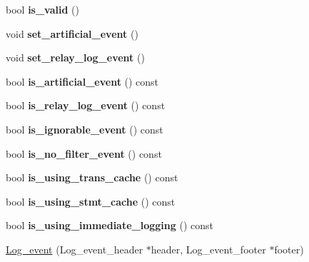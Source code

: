 \begin{DoxyCompactItemize}
\item 
\mbox{\label{classLog__event_a36936e4c8aef6409e355e88ac04c527d}} 
bool {\bfseries is\+\_\+valid} ()
\item 
\mbox{\label{classLog__event_a727215ddea7b935092b3f97e3308b9cf}} 
void {\bfseries set\+\_\+artificial\+\_\+event} ()
\item 
\mbox{\label{classLog__event_ad9626915a89bcd450bc21f5d02077a4d}} 
void {\bfseries set\+\_\+relay\+\_\+log\+\_\+event} ()
\item 
\mbox{\label{classLog__event_aeca51c1f34e0519609d29190d897b4e3}} 
bool {\bfseries is\+\_\+artificial\+\_\+event} () const
\item 
\mbox{\label{classLog__event_a58c2463530e94d5e16f3e4245886ec7a}} 
bool {\bfseries is\+\_\+relay\+\_\+log\+\_\+event} () const
\item 
\mbox{\label{classLog__event_a69f2c8276fde3b380ee88d188a02a15c}} 
bool {\bfseries is\+\_\+ignorable\+\_\+event} () const
\item 
\mbox{\label{classLog__event_a1a946665f3bf967459b86119a287cb16}} 
bool {\bfseries is\+\_\+no\+\_\+filter\+\_\+event} () const
\item 
\mbox{\label{classLog__event_a8a919c5844b7e081aec57460ead455ae}} 
bool {\bfseries is\+\_\+using\+\_\+trans\+\_\+cache} () const
\item 
\mbox{\label{classLog__event_a146abbe657f16c14db62c9bf76c87e85}} 
bool {\bfseries is\+\_\+using\+\_\+stmt\+\_\+cache} () const
\item 
\mbox{\label{classLog__event_ad86176d503cc2937583e782a4107e4e3}} 
bool {\bfseries is\+\_\+using\+\_\+immediate\+\_\+logging} () const
\item 
\mbox{\hyperlink{classLog__event_a0cd9aa0060929d5f09af84f0e8ee6136}{Log\+\_\+event}} (Log\+\_\+event\+\_\+header $\ast$header, Log\+\_\+event\+\_\+footer $\ast$footer)
\item 
\mbox{\label{classLog__event_ab54506130fcded47a219109a4dfd6e8e}} 

\end{DoxyCompactItemize}
